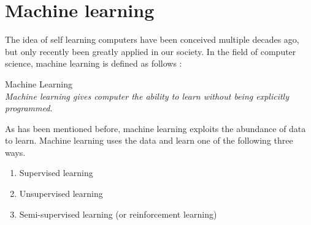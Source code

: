 \begin{comment}
\setlength{\parindent}{3ex}  When we view the 

\cite{Xu2009DetectingLogs}


By comparing a traditional news source with
Topic modelling is a very popular and high researched field. While topic modelling  
An interesting adaptation of topic modelling can be found in twitter and cyber security. Twitter is a interesting field of research with real time tweets and a huge community. Due to the nature of twitter, analysing the huge stream of tweets can be a challenging and exhaustive task. A model with LDA has been introduced to analyse and detect topics. This model is an interesting way to provide news feeds even quicker then traditional news sites . Cyber security has also been an area which LDA seems applicable to. Through the usage of Big data and combination of LDA, users could be identified through system and network logs. Using the event logs to identify topics, new events of users could be identified as malicious or normal 

\end{comment}


\section{Machine learning} \label{theory:machinelearning}
The idea of self learning computers have been conceived multiple decades ago, but only recently been greatly applied in our society.
In the field of computer science, machine learning is defined as follows \cite{Samuel1959SomeCheckers}:\\

\theoremstyle{definition} 
\begin{definition}{Machine Learning} 
\\\textit{Machine learning gives computer the ability to learn without being explicitly programmed.}
\end{definition}


As has  been mentioned before, machine learning exploits the abundance of data to learn. Machine learning uses the data and learn one of the following three ways. 

\begin{enumerate}
    \item Supervised learning
    \item Unsupervised learning
    \item Semi-supervised learning (or reinforcement learning)
\end{enumerate}

